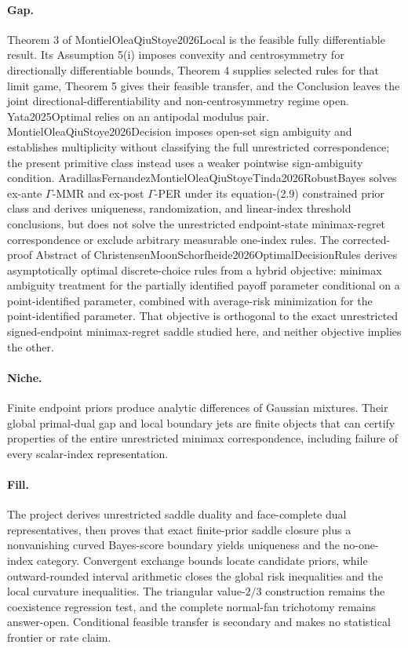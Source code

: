 \documentclass{article}
\begin{document}
\paragraph{Gap.} Theorem 3 of MontielOleaQiuStoye2026Local is the feasible fully differentiable result. Its Assumption 5(i) imposes convexity and centrosymmetry for directionally differentiable bounds, Theorem 4 supplies selected rules for that limit game, Theorem 5 gives their feasible transfer, and the Conclusion leaves the joint directional-differentiability and non-centrosymmetry regime open. Yata2025Optimal relies on an antipodal modulus pair. MontielOleaQiuStoye2026Decision imposes open-set sign ambiguity and establishes multiplicity without classifying the full unrestricted correspondence; the present primitive class instead uses a weaker pointwise sign-ambiguity condition. AradillasFernandezMontielOleaQiuStoyeTinda2026RobustBayes solves ex-ante \(\Gamma\)-MMR and ex-post \(\Gamma\)-PER under its equation-(2.9) constrained prior class and derives uniqueness, randomization, and linear-index threshold conclusions, but does not solve the unrestricted endpoint-state minimax-regret correspondence or exclude arbitrary measurable one-index rules. The corrected-proof Abstract of ChristensenMoonSchorfheide2026OptimalDecisionRules derives asymptotically optimal discrete-choice rules from a hybrid objective: minimax ambiguity treatment for the partially identified payoff parameter conditional on a point-identified parameter, combined with average-risk minimization for the point-identified parameter. That objective is orthogonal to the exact unrestricted signed-endpoint minimax-regret saddle studied here, and neither objective implies the other.

\paragraph{Niche.} Finite endpoint priors produce analytic differences of Gaussian mixtures. Their global primal-dual gap and local boundary jets are finite objects that can certify properties of the entire unrestricted minimax correspondence, including failure of every scalar-index representation.

\paragraph{Fill.} The project derives unrestricted saddle duality and face-complete dual representatives, then proves that exact finite-prior saddle closure plus a nonvanishing curved Bayes-score boundary yields uniqueness and the no-one-index category. Convergent exchange bounds locate candidate priors, while outward-rounded interval arithmetic closes the global risk inequalities and the local curvature inequalities. The triangular value-\(2/3\) construction remains the coexistence regression test, and the complete normal-fan trichotomy remains answer-open. Conditional feasible transfer is secondary and makes no statistical frontier or rate claim.
\end{document}
